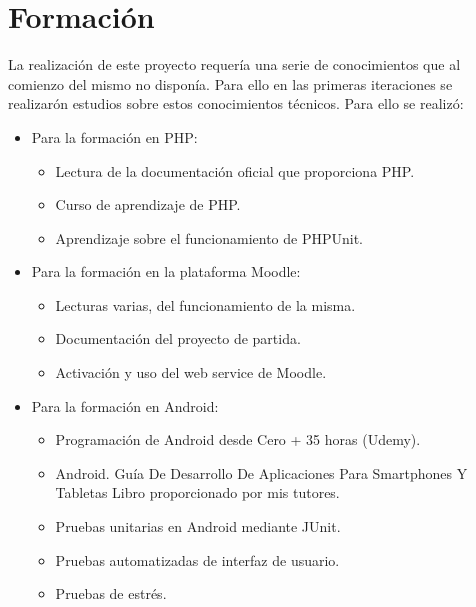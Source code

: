 \section{Formación}

La realización de este proyecto requería una serie de conocimientos que al comienzo del mismo no disponía. Para ello en las primeras iteraciones se realizarón estudios sobre estos conocimientos técnicos. Para ello se realizó:

\begin{itemize}

	\item Para la formación en PHP:
	
	\begin{itemize}
		
		\item Lectura de la documentación oficial que proporciona PHP. \cite{wiki:phpdoc}
		
		\item Curso de aprendizaje de PHP. \cite{wiki:phpcourse}
		
		\item Aprendizaje sobre el funcionamiento de PHPUnit. \cite{wiki:phpunit2}
		
	\end{itemize}
	
	\item Para la formación en la plataforma Moodle:
	
	\begin{itemize}
	
			\item Lecturas varias, del funcionamiento de la misma.
			
			\item Documentación del proyecto de partida.
			
			\item Activación y uso del web service de Moodle.
	
	\end{itemize}
	
	\item Para la formación en Android:
	\begin{itemize}
		
		\item Programación de Android desde Cero + 35 horas (Udemy).
		
		\item Android. Guía De Desarrollo De Aplicaciones Para Smartphones Y Tabletas \cite{wiki:book} Libro proporcionado por mis tutores.
		
		\item Pruebas unitarias en Android mediante JUnit.
		
		\item Pruebas automatizadas de interfaz de usuario. \cite{wiki:espressoYouTube}
		
		\item Pruebas de estrés. \cite{wiki:monkey}
		
	
	\end{itemize}

\end{itemize}



